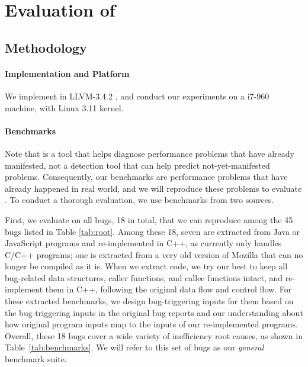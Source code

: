\section{Evaluation of \Tool}
\label{sec:experiment}

\subsection{Methodology}
\label{sec:result_meth}



\paragraph{Implementation and Platform}
We implement \Tool in LLVM-3.4.2 \cite{llvm}, and conduct our
experiments on a i7-960 machine, with Linux 3.11 kernel. 

\paragraph{Benchmarks}
Note that \Tool is a tool that helps diagnose performance problems that
have already manifested, not a detection tool that can help predict not-yet-manifested
problems. Consequently, our benchmarks are performance problems that have already
happened in real world, and we will reproduce these problems to evaluate \Tool.
To conduct a thorough evaluation, we use
benchmarks from two sources.

First, we evaluate \Tool on all bugs, 18 in total, that we can reproduce 
among the 45 bugs listed in Table \ref{tab:root}. 
Among these 18, seven are extracted from Java or JavaScript
programs and re-implemented in C++, as \Tool currently only handles C/C++
programs; one is extracted from a very old version of Mozilla that can no longer be
compiled as it is.
When we extract code, we try our best to keep all bug-related data structures,
caller functions, and callee functions intact, and re-implement them in C++, 
following the original data flow and control flow. For these extracted benchmarks, 
we design bug-triggering inputs for them based on the bug-triggering inputs in 
the original bug reports and our understanding about how original program inputs
map to the inputs of our re-implemented programs.
Overall, these 18 bugs cover a wide variety of inefficiency root causes, as 
shown in Table~\ref{tab:benchmarks}. 
We will refer to this set of bugs as our \emph{general} benchmark suite.

